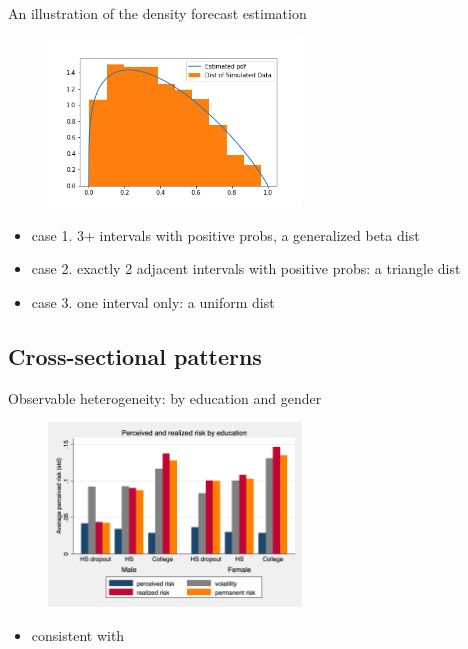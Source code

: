 \documentclass{beamer}
\begin{document}
\begin{frame}{An illustration of the density forecast estimation}
	\begin{figure}
		\centering
		\label{fig: dens_est_illutration}
			\includegraphics[width=0.6\textwidth]{figures/dens_est_illutration.png}
	\end{figure}

\begin{itemize}
	\item  case 1. 3+ intervals with positive probs, a generalized beta dist
	\item case 2. exactly 2 adjacent intervals with positive probs: a triangle dist 
	\item case 3. one interval only: a uniform dist
\end{itemize}

\end{frame}




\subsection{Cross-sectional patterns}


\begin{frame}{Observable heterogeneity: by education and gender}
	\label{observable_heterogeneity_by_educ}
	\begin{figure}[ht]
		\label{compare_by_gender_educ}
		\centering
		\includegraphics[width=0.60\textwidth]{figures/boxplot_rvar_compare_educ.png}
	\end{figure}
	\begin{itemize}
		\item consistent with  \cite{meghir2004income}
	\end{itemize}
\end{frame}
\end{document}
